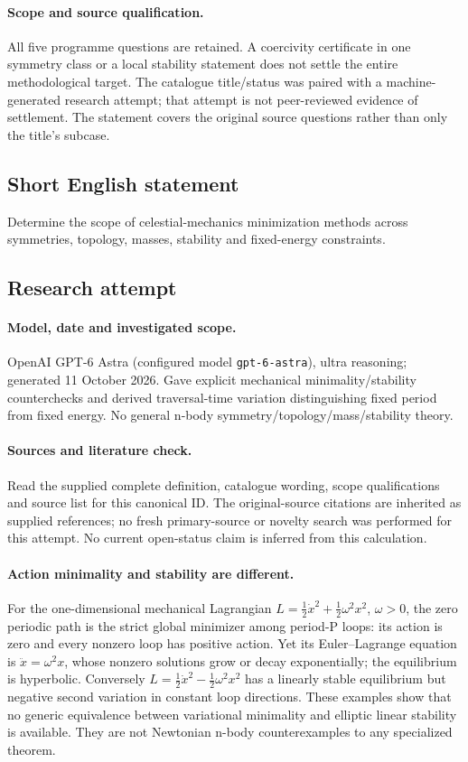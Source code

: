 \documentclass[11pt]{article}
\begin{document}
\paragraph{Scope and source qualification.}All five programme questions are retained. A coercivity certificate in one symmetry class or a local stability statement does not settle the entire methodological target. The catalogue title/status was paired with a machine-generated research attempt; that attempt is not peer-reviewed evidence of settlement. The statement covers the original source questions rather than only the title’s subcase.
\subsection{Short English statement}
Determine the scope of celestial-mechanics minimization methods across symmetries, topology, masses, stability and fixed-energy constraints.
\subsection{Research attempt}
\paragraph{Model, date and investigated scope.}
OpenAI GPT-6 Astra (configured model \texttt{gpt-6-astra}), ultra reasoning; generated 11 October 2026. Gave explicit mechanical minimality/stability counterchecks and derived traversal-time variation distinguishing fixed period from fixed energy. No general n-body symmetry/topology/mass/stability theory.

\paragraph{Sources and literature check.}
Read the supplied complete definition, catalogue wording, scope qualifications and source list for this canonical ID. The original-source citations are inherited as supplied references; no fresh primary-source or novelty search was performed for this attempt. No current open-status claim is inferred from this calculation.

\paragraph{Action minimality and stability are different.}For the one-dimensional mechanical Lagrangian \(L=\tfrac12\dot x^2+\tfrac12\omega^2x^2\), \(\omega>0\), the zero periodic path is the strict global minimizer among period-P loops: its action is zero and every nonzero loop has positive action. Yet its Euler--Lagrange equation is \(\ddot x=\omega^2x\), whose nonzero solutions grow or decay exponentially; the equilibrium is hyperbolic. Conversely \(L=\tfrac12\dot x^2-\tfrac12\omega^2x^2\) has a linearly stable equilibrium but negative second variation in constant loop directions. These examples show that no generic equivalence between variational minimality and elliptic linear stability is available. They are not Newtonian n-body counterexamples to any specialized theorem.
\end{document}
